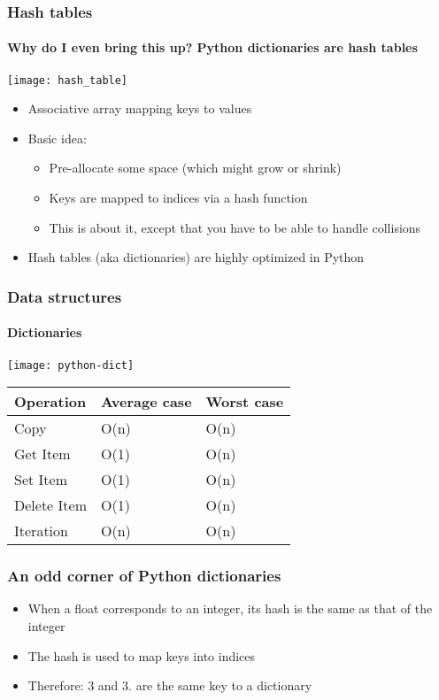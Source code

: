 \documentclass[9pt]{beamer}
\begin{document}
\begin{frame}
  \frametitle{Hash tables}
  \framesubtitle{Why do I even bring this up? Python dictionaries are hash tables}
  \centering\texttt{[image: hash\_table]}

  \begin{itemize}
  \item Associative array mapping keys to values
  \item Basic idea:
    \begin{itemize}
    \item Pre-allocate some space (which might grow or shrink)
    \item Keys are mapped to indices via a hash function
    \item This is about it, except that you have to be able to handle collisions
    \end{itemize}
  \item Hash tables (aka dictionaries) are highly optimized in Python
  \end{itemize}
\end{frame}


\begin{frame}
  \frametitle{Data structures}
  \framesubtitle{Dictionaries}
  \centering\texttt{[image: python-dict]}

  \bigskip

  \begin{tabular}{lll}
    \hline
    Operation & Average case & Worst case\\
    \hline
    \hline
    Copy & O(n) & O(n)\\
    Get Item & O(1) & O(n)\\
    Set Item & O(1) & O(n)\\
    Delete Item & O(1) & O(n)\\
    Iteration & O(n) & O(n)\\
    \hline
  \end{tabular}
\end{frame}


\begin{frame}
  \frametitle{An odd corner of Python dictionaries}
  

  \begin{itemize}
  \item When a float corresponds to an integer, its hash is the same as that
    of the integer
  \item The hash is used to map keys into indices
  \item Therefore: $3$ and $3.$ are the same key to a dictionary
  \end{itemize}
\end{frame}
\end{document}
